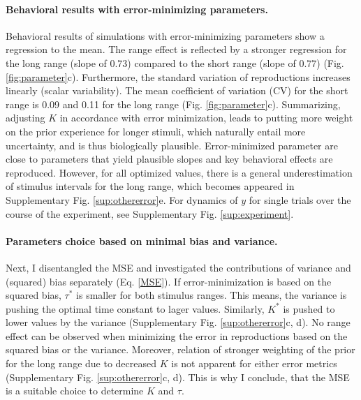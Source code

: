 \documentclass[10pt]{article}
\begin{document}
\paragraph{Behavioral results with error-minimizing parameters.}
Behavioral results of simulations with error-minimizing parameters show a regression to the mean. The range effect is reflected by a stronger regression for the long range (slope of 0.73) compared to the short range (slope of 0.77) (Fig. \ref{fig:parameter}c). 
Furthermore, the standard variation of reproductions increases linearly (scalar variability). The mean coefficient of variation (CV) for the short range is 0.09 and 0.11 for the long range (Fig. \ref{fig:parameter}c).
Summarizing, adjusting $K$ in accordance with error minimization, leads to putting more weight on the prior experience for longer stimuli, which naturally entail more uncertainty, and is thus biologically plausible.
Error-minimized parameter are close to parameters that yield plausible slopes and key behavioral effects are reproduced.
However, for all optimized values, there is a general underestimation of stimulus intervals for the long range, which becomes appeared in Supplementary Fig. \ref{sup:othererror}e.
For dynamics of $y$ for single trials over the course of the experiment, see Supplementary Fig. \ref{sup:experiment}.

\paragraph{Parameters choice based on minimal bias and variance.}
Next, I disentangled the MSE and investigated the contributions of variance and (squared) bias separately (Eq. \ref{MSE}).
If error-minimization is based on the squared bias, $\tau^*$ is smaller for both stimulus ranges. This means, the variance is pushing the optimal time constant to lager values. %
Similarly, $K^*$ is pushed to lower values by the variance (Supplementary Fig. \ref{sup:othererror}c, d).
No range effect can be observed when minimizing the error in reproductions based on the squared bias or the variance. 
Moreover, relation of stronger weighting of the prior for the long range due to decreased $K$ is not apparent for either error metrics (Supplementary Fig. \ref{sup:othererror}c, d).
This is why I conclude, that the MSE is a suitable choice to determine $K$ and $\tau$.
\end{document}
